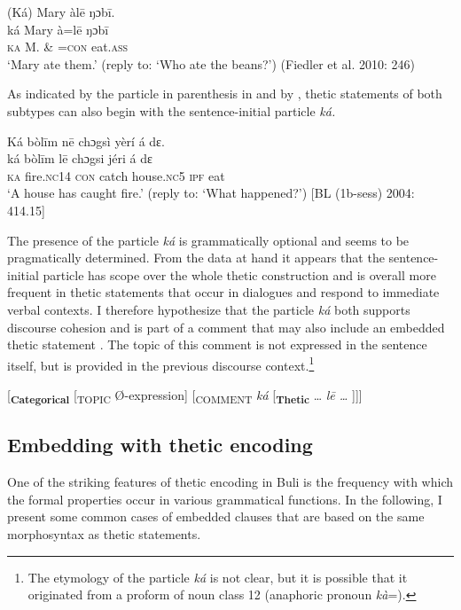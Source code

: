 \documentclass[output=paper]{langsci/langscibook}
\begin{document}
\ea
\glll \textup{}  (Ká)  Mary  àl\={e}    ŋɔb\={i}.\\
  \textup{  ká  Mary  à=l\={e}    ŋɔb\={i}}\\
     \textsc{  }\textsc{ka}  M.  \& =\textsc{con}  eat.\textsc{ass}\\
\glt ‘Mary ate them.’ (reply to: ‘Who ate the beans?’) (Fiedler et al. 2010: 246)
\z

As indicated by the particle in parenthesis in  and by , thetic statements of both subtypes can also begin with the sentence-initial particle \textit{ká. }

\ea
\glll \textup{}  Ká  bòl\={i}m    n\={e}  chɔgsì  yèrí    á  dɛ.\\
  \textup{  ká  bòl\={i}m    l\={e}  chɔgsi  jéri    á  dɛ}\\
     \textsc{  ka}  fire.\textsc{nc}14  \textsc{con}  catch   house.\textsc{nc}5   \textsc{ipf}   eat\\
\glt ‘A house has caught fire.’ (reply to: ‘What happened?’) [BL (1b-sess) 2004: 414.15]
\z

The presence of the particle \textit{ká }is grammatically optional and seems to be pragmatically determined. From the data at hand it appears that the sentence-initial particle has scope over the whole thetic construction and is overall more frequent in thetic statements that occur in dialogues and respond to immediate verbal contexts. I therefore hypothesize that the particle \textit{ká }both supports discourse cohesion and is part of a comment that may also include an embedded thetic statement . The topic of this comment is not expressed in the sentence itself, but is provided in the previous discourse context.\footnote{   The etymology of the particle \textit{ká }is not clear, but it is possible that it originated from a proform of noun class 12 (anaphoric pronoun \textit{kà}=).} 

\ea
{  [\textbf{\textsubscript{Categorical}}\textsubscript{ }[\textsubscript{TOPIC }Ø-expression]\textsubscript{ }[\textsubscript{COMMENT}\textit{ ká} [\textbf{\textsubscript{Thetic}} … \textit{l\={e} … }]]]}
\z

\subsection{Embedding with thetic encoding} %

One of the striking features of thetic encoding in Buli is the frequency with which the formal properties occur in various grammatical functions. In the following, I present some common cases of embedded clauses that are based on the same morphosyntax as thetic statements.
\end{document}
